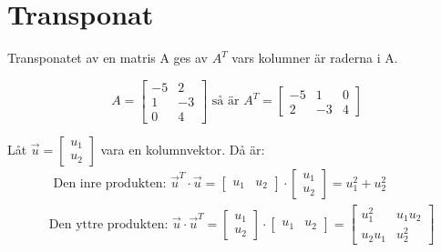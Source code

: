 \section{Transponat} %
\label{sec:transponat}
\begin{Def}
    Transponatet av en matris A ges av $A^T$ vars kolumner är raderna i A.
\end{Def}
\begin{Ex}
    \[
        A = \begin{bmatrix} -5&2\\1&-3\\0&4 \end{bmatrix} \mbox{ så är } A^T = \begin{bmatrix} -5&1&0\\2&-3&4 \end{bmatrix}
    \]
\end{Ex}
\begin{Ex}
    Låt $\vec{u} = \begin{bmatrix} u_1\\u_2 \end{bmatrix}$ vara en kolumnvektor. Då är:
    \begin{align*}
    	&\mbox{ Den inre produkten: } \vec{u}^T \cdot \vec{u} = \begin{bmatrix} u_1&u_2 \end{bmatrix} \cdot \begin{bmatrix} u_1\\u_2 \end{bmatrix} = u^2_1 + u^2_2\\
    	&\mbox{Den yttre produkten: } \vec{u} \cdot \vec{u}^T = \begin{bmatrix} u_1\\u_2 \end{bmatrix} \cdot \begin{bmatrix} u_1&u_2 \end{bmatrix} = \begin{bmatrix} u^2_1&u_1u_2\\u_2u_1&u^2_2 \end{bmatrix}
    \end{align*}
\end{Ex}
